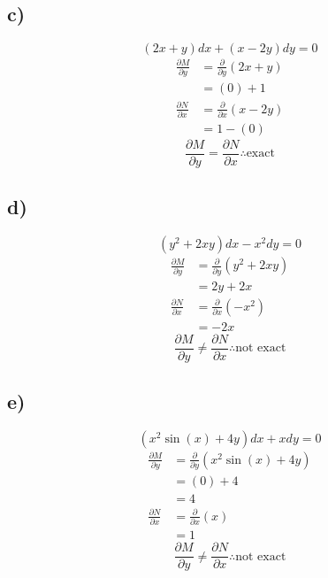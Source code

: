 \documentclass{article}
\begin{document}
\subsection{c)}
$$ (2x + y)dx + (x - 2y)dy = 0 $$
\begin{align*}
	\frac{\partial M}{\partial y} & = \frac{\partial}{\partial y} \left( 2x + y \right) \\
								  & = (0) + 1 \\
	\frac{\partial N}{\partial x} & = \frac{\partial}{\partial x} \left( x - 2y \right) \\
								  & = 1 - (0)
\end{align*}
\begin{equation*}
	\boxed{
		\frac{\partial M}{\partial y} = \frac{\partial N}{\partial x} \therefore \text{exact}
	}
\end{equation*}

\subsection{d)}
$$ (y^2 + 2xy)dx - x^2dy = 0 $$
\begin{align*}
	\frac{\partial M}{\partial y} & = \frac{\partial}{\partial y} \left( y^2 + 2xy \right) \\
								  & = 2y + 2x \\
	\frac{\partial N}{\partial x} & = \frac{\partial}{\partial x} \left( -x^2 \right) \\
								  & = -2x
\end{align*}
\begin{equation*}
	\boxed{
		\frac{\partial M}{\partial y} \neq \frac{\partial N}{\partial x} \therefore \text{not exact}
	}
\end{equation*}

\subsection{e)}
$$ (x^2\sin(x) + 4y)dx + xdy = 0 $$
\begin{align*}
	\frac{\partial M}{\partial y} & = \frac{\partial}{\partial y} \left( x^2\sin(x) + 4y \right) \\
								  & = (0) + 4 \\
								  & = 4 \\
	\frac{\partial N}{\partial x} & = \frac{\partial}{\partial x} \left( x \right) \\
								  & = 1
\end{align*}
\begin{equation*}
	\boxed{
		\frac{\partial M}{\partial y} \neq \frac{\partial N}{\partial x} \therefore \text{not exact}
	}
\end{equation*}
\end{document}
